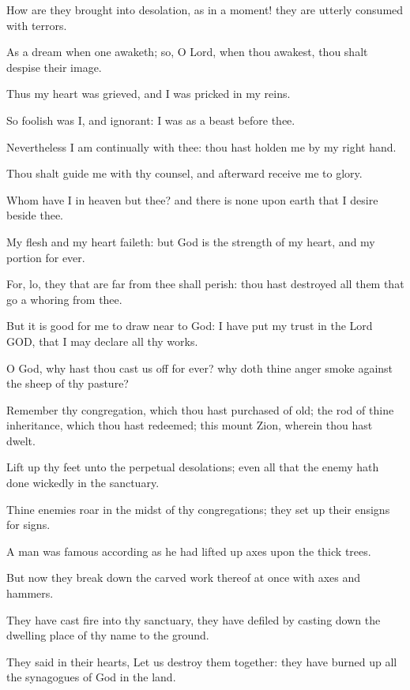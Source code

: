 \Verse How are they brought into desolation, as in a moment! they are utterly consumed with terrors.

\Verse As a dream when one awaketh; so, O Lord, when thou awakest, thou shalt despise their image.

\Verse Thus my heart was grieved, and I was pricked in my reins.

\Verse So foolish was I, and ignorant: I was as a beast before thee.

\Verse Nevertheless I am continually with thee: thou hast holden me by my right hand.

\Verse Thou shalt guide me with thy counsel, and afterward receive me to glory.

\Verse Whom have I in heaven but thee? and there is none upon earth that I desire beside thee.

\Verse My flesh and my heart faileth: but God is the strength of my heart, and my portion for ever.

\Verse For, lo, they that are far from thee shall perish: thou hast destroyed all them that go a whoring from thee.

\Verse But it is good for me to draw near to God: I have put my trust in the Lord GOD, that I may declare all thy works.




\Chapter
\Verse O God, why hast thou cast us off for ever? why doth thine anger smoke against the sheep of thy pasture?

\Verse Remember thy congregation, which thou hast purchased of old; the rod of thine inheritance, which thou hast redeemed; this mount Zion, wherein thou hast dwelt.

\Verse Lift up thy feet unto the perpetual desolations; even all that the enemy hath done wickedly in the sanctuary.

\Verse Thine enemies roar in the midst of thy congregations; they set up their ensigns for signs.

\Verse A man was famous according as he had lifted up axes upon the thick trees.

\Verse But now they break down the carved work thereof at once with axes and hammers.

\Verse They have cast fire into thy sanctuary, they have defiled by casting down the dwelling place of thy name to the ground.

\Verse They said in their hearts, Let us destroy them together: they have burned up all the synagogues of God in the land.

